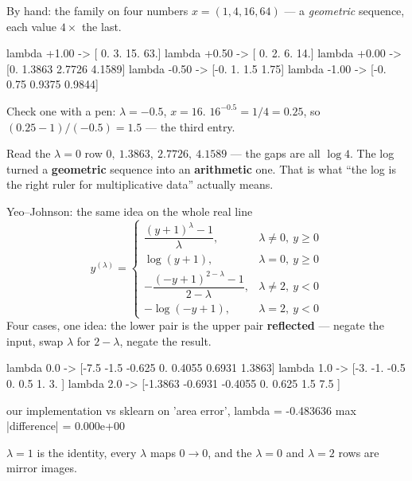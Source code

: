 \documentclass[aspectratio=169]{beamer}
\begin{document}
\begin{frame}[fragile,shrink=4]{By hand: the family on four numbers}
$x = (1, 4, 16, 64)$ --- a \emph{geometric} sequence, each value $4\times$ the last.
\begin{outblk}
  lambda +1.00  ->  [ 0.  3. 15. 63.]
  lambda +0.50  ->  [ 0.  2.  6. 14.]
  lambda +0.00  ->  [0.     1.3863 2.7726 4.1589]
  lambda -0.50  ->  [-0.    1.    1.5   1.75]
  lambda -1.00  ->  [-0.      0.75    0.9375  0.9844]
\end{outblk}
\vspace{0.2em}
Check one with a pen: $\lambda=-0.5$, $x=16$. $16^{-0.5} = 1/4 = 0.25$, so
$(0.25-1)/(-0.5) = \mathbf{1.5}$ --- the third entry.
\begin{alertblock}{Read the $\lambda=0$ row}
  \footnotesize $0,\ 1.3863,\ 2.7726,\ 4.1589$ --- the gaps are all
  $\log 4$. The log turned a \textbf{geometric} sequence into an
  \textbf{arithmetic} one. That is what ``the log is the right ruler for
  multiplicative data'' actually means.
\end{alertblock}
\end{frame}

\begin{frame}[fragile,shrink=6]{Yeo--Johnson: the same idea on the whole real line}
\[
  y^{(\lambda)} =
  \begin{cases}
    \dfrac{(y+1)^{\lambda}-1}{\lambda}, & \lambda \neq 0,\ y \ge 0\\[7pt]
    \log(y+1), & \lambda = 0,\ y \ge 0\\[7pt]
    -\dfrac{(-y+1)^{2-\lambda}-1}{2-\lambda}, & \lambda \neq 2,\ y < 0\\[7pt]
    -\log(-y+1), & \lambda = 2,\ y < 0
  \end{cases}
\]
\vspace{0.1em}
Four cases, one idea: the lower pair is the upper pair \textbf{reflected} ---
negate the input, swap $\lambda$ for $2-\lambda$, negate the result.
\begin{outblk}
  lambda 0.0 -> [-7.5    -1.5    -0.625   0.      0.4055  0.6931  1.3863]
  lambda 1.0 -> [-3.  -1.  -0.5  0.   0.5  1.   3. ]
  lambda 2.0 -> [-1.3863 -0.6931 -0.4055  0.      0.625   1.5     7.5   ]

our implementation vs sklearn on 'area error', lambda = -0.483636
  max |difference| = 0.000e+00
\end{outblk}
\begin{center}\small
  $\lambda=1$ is the identity, every $\lambda$ maps $0\to0$, and the
  $\lambda=0$ and $\lambda=2$ rows are mirror images.
\end{center}
\end{frame}
\end{document}

